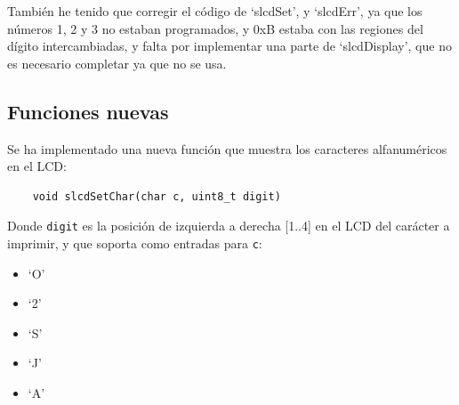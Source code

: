 \documentclass[a4paper,openright,12pt]{article}
\begin{document}
También he tenido que corregir el código de `slcdSet', y `slcdErr', ya que los números 1, 2 y 3 no estaban programados,
y 0xB estaba con las regiones del dígito intercambiadas, y falta por implementar una parte de `slcdDisplay', que no es necesario completar ya que no se usa.

\subsection{Funciones nuevas}
Se ha implementado una nueva función que muestra los caracteres alfanuméricos en el LCD:
\begin{verbatim}
    void slcdSetChar(char c, uint8_t digit)
\end{verbatim}

Donde \texttt{digit} es la posición de izquierda a derecha [1..4] en el LCD del carácter a imprimir, y que soporta como entradas para \texttt{c}:
\begin{itemize}
    \item `O'
    \item `2'
    \item `S'
    \item `J'
    \item `A'
\end{itemize}



\printbibliography[]{}
\end{document}

